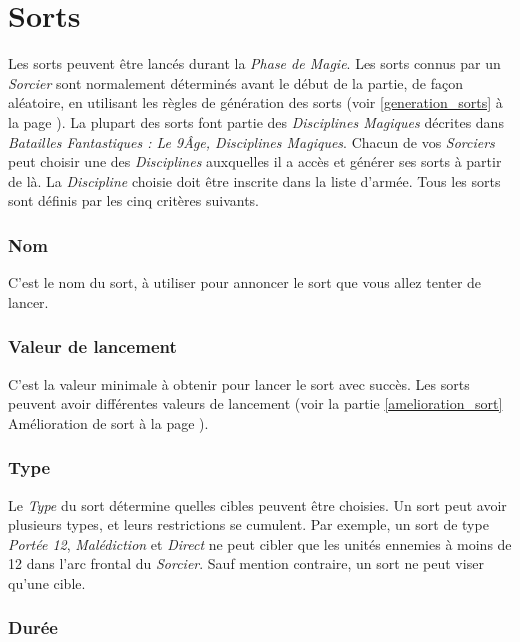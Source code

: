\section{Sorts}

Les sorts peuvent être lancés durant la \emph{Phase de Magie}. Les sorts connus par un \emph{Sorcier} sont normalement déterminés avant le début de la partie, de façon  aléatoire, en utilisant les règles de génération des sorts (voir \ref{generation_sorts} à la page \pageref{generation_sorts}). La plupart des sorts font partie des \emph{Disciplines Magiques} décrites dans \emph{Batailles Fantastiques : Le 9\ieme Âge, Disciplines Magiques}. Chacun de vos \emph{Sorciers} peut choisir une des \emph{Disciplines} auxquelles il a accès et générer ses sorts à partir de là. La \emph{Discipline} choisie doit être inscrite dans la liste d'armée. Tous les sorts sont définis par les cinq critères suivants.

\subsubsection*{Nom} 

C'est le nom du sort, à utiliser pour annoncer le sort que vous allez tenter de lancer.

\subsubsection*{Valeur de lancement} 

C'est la valeur minimale à obtenir pour lancer le sort avec succès. Les sorts peuvent avoir différentes valeurs de lancement (voir la partie \ref{amelioration_sort} Amélioration de sort à la page \pageref{amelioration_sort}).

\subsubsection*{Type}

Le \emph{Type} du sort détermine quelles cibles peuvent être choisies. Un sort peut avoir plusieurs types, et leurs restrictions se cumulent. Par exemple, un sort de type \emph{Portée \unit{12}{\pouce}}, \emph{Malédiction} et \emph{Direct} ne peut cibler que les unités ennemies à moins de \unit{12}{\pouce} dans l'arc frontal du \emph{Sorcier}. Sauf mention contraire, un sort ne peut viser qu'une cible.

\subsubsection*{Durée}


